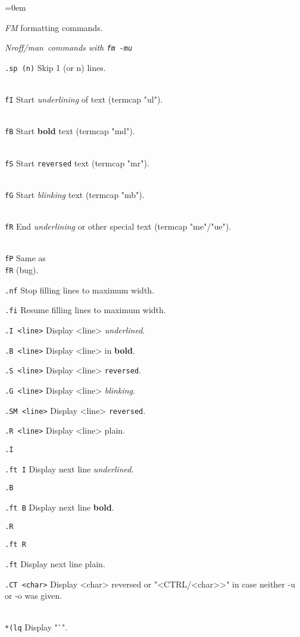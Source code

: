\hoffset=0em
\centerline{{\it FM} formatting commands.}
\bigskip

\centerline{\it Nroff/man~commands with \tt fm~-mu}
\medskip

\item{\tt .sp~(n)}	Skip 1 (or n) lines.
\item{\tt \\fI}		Start {\it underlining} of text (termcap "ul").
\item{\tt \\fB}		Start {\bf bold} text (termcap "md").
\item{\tt \\fS}		Start {\tt reversed} text (termcap "mr").
\item{\tt \\fG}		Start {\sl blinking} text (termcap "mb").
\item{\tt \\fR}		End {\it underlining} or other special text
			(termcap "me"/"ue").
\item{\tt \\fP}		Same as {\tt \\fR} (bug).
\item{\tt .nf}		Stop filling lines to maximum width.
\item{\tt .fi}		Resume filling lines to maximum width.
\item{\tt .I~<line>}	Display <line> {\it underlined}.
\item{\tt .B~<line>}	Display <line> in {\bf bold}.
\item{\tt .S~<line>}	Display <line> {\tt reversed}.
\item{\tt .G~<line>}	Display <line> {\sl blinking}.
\item{\tt .SM~<line>}	Display <line> {\tt reversed}.
\item{\tt .R~<line>}	Display <line> plain.
\item{\tt .I}
\item{\tt .ft I}	Display next line {\it underlined}.
\item{\tt .B}
\item{\tt .ft B}	Display next line {\bf bold}.
\item{\tt .R}
\item{\tt .ft R}
\item{\tt .ft}		Display next line plain.
\item{\tt .CT~<char>}	Display <char> reversed or "<CTRL/<char>>"
			in case neither -u or -o was given.
\item{\tt \\*(lq}	Display "`".
